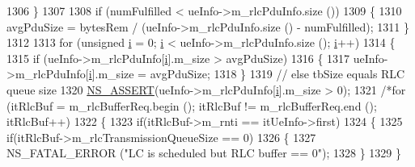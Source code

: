 \begin{DoxyCode}
1306                         \}
1307 
1308                         \textcolor{keywordflow}{if} (numFulfilled < ueInfo->m\_rlcPduInfo.size ())
1309                         \{
1310                                 avgPduSize = bytesRem / (ueInfo->m\_rlcPduInfo.size () - numFulfilled);
1311                         \}
1312 
1313                         \textcolor{keywordflow}{for} (\textcolor{keywordtype}{unsigned} \hyperlink{bernuolliDistribution_8m_a6f6ccfcf58b31cb6412107d9d5281426}{i} = 0; \hyperlink{bernuolliDistribution_8m_a6f6ccfcf58b31cb6412107d9d5281426}{i} < ueInfo->m\_rlcPduInfo.size (); 
      \hyperlink{bernuolliDistribution_8m_a6f6ccfcf58b31cb6412107d9d5281426}{i}++)
1314                         \{
1315                                 \textcolor{keywordflow}{if} (ueInfo->m\_rlcPduInfo[\hyperlink{bernuolliDistribution_8m_a6f6ccfcf58b31cb6412107d9d5281426}{i}].m\_size > avgPduSize)
1316                                 \{
1317                                         ueInfo->m\_rlcPduInfo[\hyperlink{bernuolliDistribution_8m_a6f6ccfcf58b31cb6412107d9d5281426}{i}].m\_size = avgPduSize;
1318                                 \}
1319                                 \textcolor{comment}{// else tbSize equals RLC queue size}
1320                                 \hyperlink{assert_8h_a6dccdb0de9b252f60088ce281c49d052}{NS\_ASSERT}(ueInfo->m\_rlcPduInfo[\hyperlink{bernuolliDistribution_8m_a6f6ccfcf58b31cb6412107d9d5281426}{i}].m\_size > 0);
1321                                 \textcolor{comment}{/*for (itRlcBuf = m\_rlcBufferReq.begin (); itRlcBuf != m\_rlcBufferReq.end
       (); itRlcBuf++)}
1322 \textcolor{comment}{                                                                \{}
1323 \textcolor{comment}{                                                                        if(itRlcBuf->m\_rnti ==
       itUeInfo->first)}
1324 \textcolor{comment}{                                                                        \{}
1325 \textcolor{comment}{                                                                                
      if(itRlcBuf->m\_rlcTransmissionQueueSize == 0)}
1326 \textcolor{comment}{                                                                                \{}
1327 \textcolor{comment}{                                                                                        NS\_FATAL\_ERROR ("LC
       is scheduled but RLC buffer == 0");}
1328 \textcolor{comment}{                                                                                \}}
1329 \textcolor{comment}{                                                                        \}}

\end{DoxyCode}

